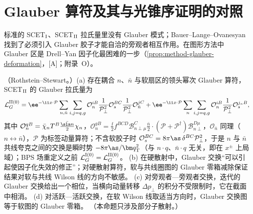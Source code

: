 \section{Glauber 算符及其与光锥序证明的对照}\label{sec:scet-glauber}

标准的 SCET$_{\rm I}$、SCET$_{\rm II}$ 拉氏量里没有 Glauber 模式；Bauer--Lange--Ovanesyan 找到了必须引入 Glauber 胶子才能自洽的旁观者相互作用\cite{Bauer:2010cc}。在图形方法中 Glauber 区是 Drell--Yan 因子化最困难的一步（\cref{prop:method-glauber-deformation}，[A]；附录~O）。

\begin{proposition}\label{prop:scet-glauber-operators}
（Rothstein--Stewart\cite{RothsteinStewart2016}。）(a) 存在耦合 $n$、$\bar n$ 与软扇区的领头幂次 Glauber 算符，SCET$_{\rm II}$ 的 Glauber 拉氏量为\cite[式~(5.21)]{RothsteinStewart2016}
\begin{equation}\label{eq:scet-LG}
\mathcal L_G^{\rm II(0)}=\ee^{-\ii x\cdot\mathcal P}\sum_{n,\bar n}\sum_{i,j=q,g}\mathcal O_n^{iB}\frac{1}{\mathcal P_\perp^2}\mathcal O_s^{BC}\frac{1}{\mathcal P_\perp^2}\mathcal O_{\bar n}^{jC}
+\ee^{-\ii x\cdot\mathcal P}\sum_n\sum_{i,j=q,g}\mathcal O_n^{iB}\frac{1}{\mathcal P_\perp^2}\mathcal O_s^{j_nB},
\end{equation}
其中 $\mathcal O_n^{qB}=\bar\chi_nT^B\frac{\bar{\sla n}}{2}\chi_n$，$\mathcal O_n^{gB}=\frac\ii2f^{BCD}\mathcal B^C_{n\perp\mu}\frac{\bar n}{2}\cdot(\mathcal P+\mathcal P^\dagger)\mathcal B^{D\mu}_{n\perp}$，$\mathcal O_{\bar n}$ 同理（$n\leftrightarrow\bar n$），$\mathcal P$ 为标签动量算符；不含软胶子时 $\mathcal O_s^{BC}=8\pi\as\,\delta^{BC}\mathcal P_\perp^2$，于是 $n$ 与 $\bar n$ 共线夸克之间的交换是瞬时势 $-8\pi\as/\bm q_{\mathrm T}^2$（与 $n\cdot q$、$\bar n\cdot q$ 无关，即在 $x^\pm$ 上局域）；BPS 场重定义之前 $\mathcal L_G^{\rm I(0)}=\mathcal L_G^{\rm II(0)}$。
(b) 在硬散射中，Glauber 交换“可以引起使因子化失效的修正”；对硬散射算符，软与共线圈图的 Glauber 零箱减除保证结果对软与共线 Wilson 线的方向不敏感。
(c) 对旁观者—旁观者交换，迭代的 Glauber 交换给出一个相位，当横向动量转移 $\Delta p_\perp$ 的积分不受限制时，它在截面中相消。
(d) 对活跃—活跃交换，在软 Wilson 线取适当方向时，Glauber 交换图等于软图的 Glauber 零箱\cite[第~10.1~节]{RothsteinStewart2016}。
（本命题只涉及部分子散射。）
\end{proposition}

